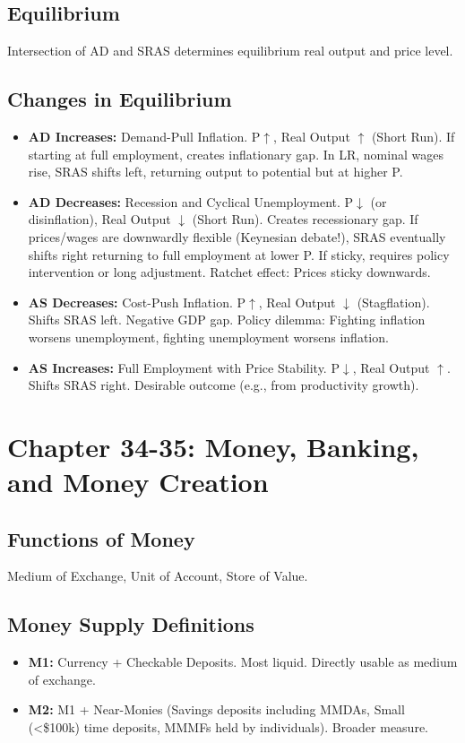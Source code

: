 \documentclass{article}
\begin{document}
\subsection*{Equilibrium}
Intersection of AD and SRAS determines equilibrium real output and price level.

\subsection*{Changes in Equilibrium}
\begin{itemize}
    \item \textbf{AD Increases:} Demand-Pull Inflation. P$\uparrow$, Real Output $\uparrow$ (Short Run). If starting at full employment, creates inflationary gap. In LR, nominal wages rise, SRAS shifts left, returning output to potential but at higher P.
    \item \textbf{AD Decreases:} Recession and Cyclical Unemployment. P$\downarrow$ (or disinflation), Real Output $\downarrow$ (Short Run). Creates recessionary gap. If prices/wages are downwardly flexible (Keynesian debate!), SRAS eventually shifts right returning to full employment at lower P. If sticky, requires policy intervention or long adjustment. Ratchet effect: Prices sticky downwards.
    \item \textbf{AS Decreases:} Cost-Push Inflation. P$\uparrow$, Real Output $\downarrow$ (Stagflation). Shifts SRAS left. Negative GDP gap. Policy dilemma: Fighting inflation worsens unemployment, fighting unemployment worsens inflation.
    \item \textbf{AS Increases:} Full Employment with Price Stability. P$\downarrow$, Real Output $\uparrow$. Shifts SRAS right. Desirable outcome (e.g., from productivity growth).
\end{itemize}

\section*{Chapter 34-35: Money, Banking, and Money Creation}

\subsection*{Functions of Money}
Medium of Exchange, Unit of Account, Store of Value.

\subsection*{Money Supply Definitions}
\begin{itemize}
    \item \textbf{M1:} Currency + Checkable Deposits. Most liquid. Directly usable as medium of exchange.
    \item \textbf{M2:} M1 + Near-Monies (Savings deposits including MMDAs, Small (<\$100k) time deposits, MMMFs held by individuals). Broader measure.
\end{itemize}
\end{document}
